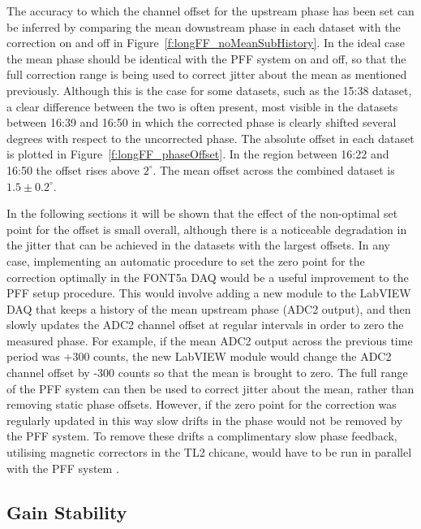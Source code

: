 The accuracy to which the channel offset for the upstream phase has been set can be inferred by comparing the mean downstream phase in each dataset with the correction on  and off in Figure~\ref{f:longFF_noMeanSubHistory}. In the ideal case the mean phase should be identical with the PFF system on and off, so that the full correction range is being used to correct jitter about the mean as mentioned previously. Although this is the case for some datasets, such as the 15:38 dataset, a clear difference between the two is often present, most visible in the datasets between 16:39 and 16:50 in which the corrected phase is clearly shifted several degrees with respect to the uncorrected phase. The absolute offset in each dataset is plotted in Figure~\ref{f:longFF_phaseOffset}. In the region between 16:22 and 16:50 the offset rises above \(2^\circ\). The mean offset across the combined dataset is \(1.5\pm0.2^\circ\). 


In the following sections it will be shown that the effect of the non-optimal set point for the offset is small overall, although there is a noticeable degradation in the jitter that can be achieved in the datasets with the largest offsets. In any case, implementing an automatic procedure to set the zero point for the correction optimally in the FONT5a DAQ would be a useful improvement to the PFF setup procedure. This would involve adding a new module to the LabVIEW DAQ that keeps a history of the mean upstream phase (ADC2 output), and then slowly updates the ADC2 channel offset at regular intervals in order to zero the measured phase. For example, if the mean ADC2 output across the previous time period was +300 counts, the new LabVIEW module would change the ADC2 channel offset by -300 counts so that the mean is brought to zero. The full range of the PFF system can then be used to correct jitter about the mean, rather than removing static phase offsets. However, if the zero point for the correction was regularly updated in this way slow drifts in the phase would not be removed by the PFF system. To remove these drifts a complimentary slow phase feedback, utilising magnetic correctors in the TL2 chicane, would have to be run in parallel with the PFF system \cite{jackLCWS14}.



\subsection{Gain Stability}
\label{ss:longFF_gain}


